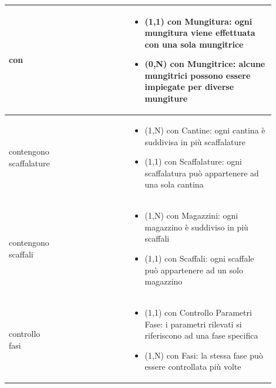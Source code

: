 \documentclass[12pt,a4paper]{article}
\begin{document}
\begin{center}
\begin{longtable}{|p{0.16\linewidth}|p{0.24\linewidth}|p{0.50\linewidth}|}
\hline
con 				& \begin{flushleft}\vspace{-15pt}  \end{flushleft}
					& \begin{itemize}
						\setlength{\itemindent}{-1em}
						\vspace{-25pt}
						\setlength\itemsep{-0.25em}
						\item (1,1) con Mungitura: ogni mungitura viene effettuata con una sola mungitrice
						\item (0,N) con Mungitrice: alcune mungitrici possono essere impiegate per diverse mungiture
					\end{itemize}\\ 

\hline
contengono scaffalature 				& \begin{flushleft}\vspace{-15pt}  \end{flushleft}
					& \begin{itemize}
						\setlength{\itemindent}{-1em}
						\vspace{-25pt}
						\setlength\itemsep{-0.25em}
						\item (1,N) con Cantine: ogni cantina è suddivisa in più scaffalature
						\item (1,1) con Scaffalature: ogni scaffalatura può appartenere ad una sola cantina					\end{itemize}\\ 

\hline
contengono scaffali 				& \begin{flushleft}\vspace{-15pt}  \end{flushleft}
					& \begin{itemize}
						\setlength{\itemindent}{-1em}
						\vspace{-25pt}
						\setlength\itemsep{-0.25em}
						\item (1,N) con Magazzini: ogni magazzino è suddiviso in più scaffali
						\item (1,1) con Scaffali: ogni scaffale può appartenere ad un solo magazzino
					\end{itemize}\\ 

\hline
controllo fasi 				& \begin{flushleft}\vspace{-25pt} \end{flushleft}
					& \begin{itemize}
						\setlength{\itemindent}{-1em}
						\vspace{-25pt}
						\setlength\itemsep{-0.25em}
						\item (1,1) con Controllo Parametri Fase: i parametri rilevati si riferiscono ad una fase specifica
						\item (1,N) con Fasi: la stessa fase può essere controllata più volte
					\end{itemize}\\ 


\end{longtable}
\end{center}
\end{document}
